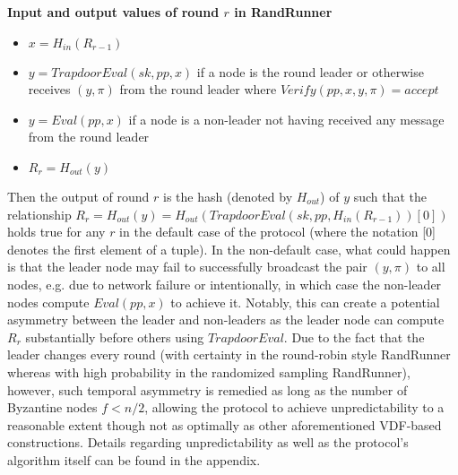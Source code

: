 \documentclass[letterpaper,twocolumn,10pt]{article}
\theoremstyle{definition}
\theoremstyle{remark}
\begin{document}
\textbf{Input and output values of round $r$ in RandRunner}
\begin{itemize}
\item $x = H_{in}(R_{r - 1})$
\item $y = TrapdoorEval(sk, pp, x)$ if a node is the round leader or otherwise receives $(y, \pi)$ from the round leader where $Verify(pp, x, y, \pi) = accept$
\item $y = Eval(pp, x)$ if a node is a non-leader not having received any message from the round leader
\item $R_r = H_{out}(y)$
\end{itemize}

Then the output of round $r$ is the hash (denoted by $H_{out}$) of $y$ such that the relationship $R_r = H_{out}(y) = H_{out}(TrapdoorEval(sk, pp, H_{in}(R_{r - 1}))[0])$ holds true for any $r$ in the default case of the protocol (where the notation [0] denotes the first element of a tuple). In the non-default case, what could happen is that the leader node may fail to successfully broadcast the pair $(y, \pi)$ to all nodes, e.g. due to network failure or intentionally, in which case the non-leader nodes compute $Eval(pp, x)$ to achieve it. Notably, this can create a potential asymmetry between the leader and non-leaders as the leader node can compute $R_r$ substantially before others using $TrapdoorEval$. Due to the fact that the leader changes every round (with certainty in the round-robin style RandRunner whereas with high probability in the randomized sampling RandRunner), however, such temporal asymmetry is remedied as long as the number of Byzantine nodes $f < n / 2$, allowing the protocol to achieve unpredictability to a reasonable extent though not as optimally as other aforementioned VDF-based constructions. Details regarding unpredictability as well as the protocol's algorithm itself can be found in the appendix.

\printbibliography


\end{document}
